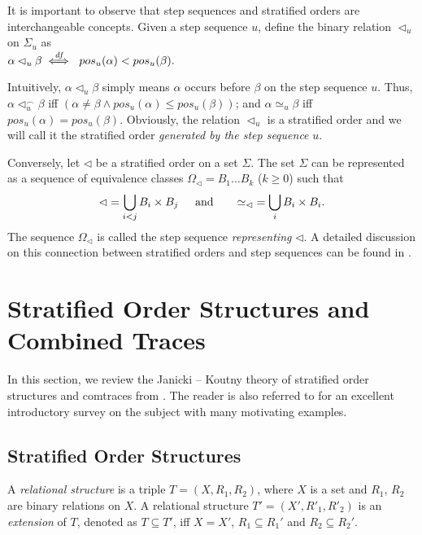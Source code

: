 \documentclass{llncs}
\begin{document}
It is important to observe that step sequences and stratified orders are interchangeable concepts. Given a step sequence $u$, define the binary relation $\lhd_u$  on $\Sigma_u$ as\\
\mbox{\hspace{3.6cm}}$\alpha \lhd_u \beta \stackrel{\textit{\scriptsize{df}}}{\iff}\  pos_u(\alpha)<pos_u(\beta).$

Intuitively, $\alpha \lhd_u \beta$ simply means $\alpha$ occurs before $\beta$ on the step sequence $u$. Thus, $\alpha \lhd_u^\frown \beta$ iff $(\alpha\not=\beta\wedge pos_u(\alpha)\le pos_u(\beta))$; and $\alpha\simeq_u \beta$ iff  $pos_u(\alpha)=pos_u(\beta)$. Obviously, the relation $\lhd_u$ is a stratified order and we will call it the stratified order {\em generated by the step sequence} $u$.


Conversely, let $\lhd$ be a stratified order on a set $\Sigma$. The set $\Sigma$ can be represented as a
sequence of equivalence classes $\Omega_\lhd=B_1\ldots B_k$ ($k\ge 0$) such that \[\lhd = \bigcup_{i<j}B_i\times B_j\text{\mbox{\hspace{4mm}} and \mbox{\hspace{4mm}} }\simeq_\lhd \;= \bigcup_{i}B_i\times B_i.\]
The sequence $\Omega_\lhd$ is called the step sequence \emph{representing} $\lhd$. A detailed discussion on this connection between stratified orders and step sequences can be found in \cite{JL09}.







\section{Stratified Order Structures and Combined Traces}
In this section, we review the Janicki -- Koutny theory of stratified order structures and comtraces from \cite{JK95,JK97}. The reader is also referred to \cite{KK08} for an excellent introductory survey on the subject with many motivating examples.

\subsection{Stratified Order Structures}
A \emph{relational structure} is a triple $T=(X,R_1,R_2)$, where $X$ is a set and $R_1$, $R_2$ are binary relations on $X$. A relational structure $T'=(X',R'_1,R'_2)$ is an \emph{extension} of $T$, denoted as $T\subseteq T'$, iff $X=X'$, $R_1\subseteq R_1'$ and $R_2\subseteq R_2'$.
\end{document}
